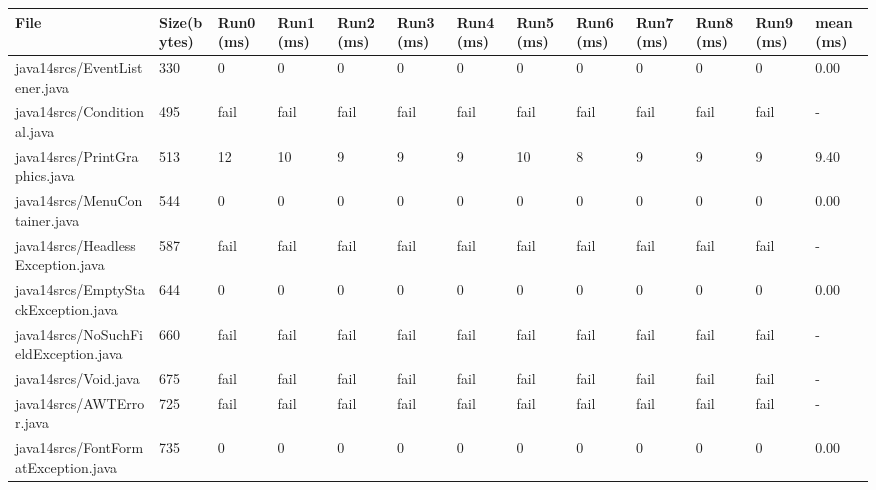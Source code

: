 \begin{tabular}{|l|l|l|l|l|l|l|l|l|l|l|l|l|}
\hline
File                                               & Size(bytes) & Run0 (ms) & Run1 (ms) & Run2 (ms) & Run3 (ms) & Run4 (ms) & Run5 (ms) & Run6 (ms) & Run7 (ms) & Run8 (ms) & Run9 (ms) & mean (ms) \\
\hline
java14srcs/EventListener.java                      & 330         & 0         & 0         & 0         & 0         & 0         & 0         & 0         & 0         & 0         & 0         & 0.00      \\
\hline
java14srcs/Conditional.java                        & 495         & fail      & fail      & fail      & fail      & fail      & fail      & fail      & fail      & fail      & fail      & -         \\
\hline
java14srcs/PrintGraphics.java                      & 513         & 12        & 10        & 9         & 9         & 9         & 10        & 8         & 9         & 9         & 9         & 9.40      \\
\hline
java14srcs/MenuContainer.java                      & 544         & 0         & 0         & 0         & 0         & 0         & 0         & 0         & 0         & 0         & 0         & 0.00      \\
\hline
java14srcs/HeadlessException.java                  & 587         & fail      & fail      & fail      & fail      & fail      & fail      & fail      & fail      & fail      & fail      & -         \\
\hline
java14srcs/EmptyStackException.java                & 644         & 0         & 0         & 0         & 0         & 0         & 0         & 0         & 0         & 0         & 0         & 0.00      \\
\hline
java14srcs/NoSuchFieldException.java               & 660         & fail      & fail      & fail      & fail      & fail      & fail      & fail      & fail      & fail      & fail      & -         \\
\hline
java14srcs/Void.java                               & 675         & fail      & fail      & fail      & fail      & fail      & fail      & fail      & fail      & fail      & fail      & -         \\
\hline
java14srcs/AWTError.java                           & 725         & fail      & fail      & fail      & fail      & fail      & fail      & fail      & fail      & fail      & fail      & -         \\
\hline
java14srcs/FontFormatException.java                & 735         & 0         & 0         & 0         & 0         & 0         & 0         & 0         & 0         & 0         & 0         & 0.00      \\

\end{tabular}
